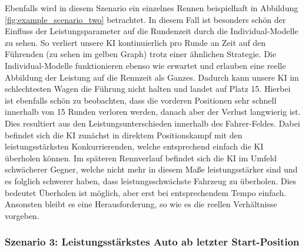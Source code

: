 Ebenfalls wird in diesem Szenario ein einzelnes Rennen beispielhaft in Abbildung \ref{fig:example_scenario_two} betrachtet. In diesem Fall ist besonders schön der Einfluss der Leistungsparameter auf die Rundenzeit durch die Individual-Modelle zu sehen. So verliert unsere KI kontinuierlich pro Runde an Zeit auf den Führenden (zu sehen im gelben Graph) trotz einer ähnlichen Strategie. Die Individual-Modelle funktionieren ebenso wie erwartet und erlauben eine reelle Abbildung der Leistung auf die Rennzeit als Ganzes. Dadurch kann unsere KI im schlechtesten Wagen die Führung nicht halten und landet auf Platz 15. Hierbei ist ebenfalls schön zu beobachten, dass die vorderen Positionen sehr schnell innerhalb von 15 Runden verloren werden, danach aber der Verlust langwierig ist. Dies resultiert aus den Leistungsunterschieden innerhalb des Fahrer-Feldes. Dabei befindet sich die KI zunächst in direktem Positionskampf mit den leistungsstärksten Konkurrierenden, welche entsprechend einfach die KI überholen können. Im späteren Rennverlauf befindet sich die KI im Umfeld schwächerer Gegner, welche nicht mehr in diesem Maße leistungsstärker sind und es folglich schwerer haben, dass leistungsschwächste Fahrzeug zu überholen. Dies bedeutet Überholen ist möglich, aber erst bei entsprechendem Tempo einfach. Ansonsten bleibt es eine Herausforderung, so wie es die reellen Verhältnisse vorgeben.


\subsubsection{Szenario 3: Leistungsstärkstes Auto ab letzter Start-Position}

